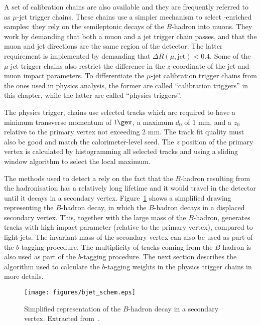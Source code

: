 A set of calibration chains are also available and they are frequently referred to as $\mu$-jet trigger chains. These chains use a simpler mechanism to select \bjet-enriched
samples: they rely on the semileptonic decays of the $B$-hadron into muons. They work by demanding that both a muon and a jet trigger chain passes, and that the muon and
jet directions are the same region of the detector. The latter requirement is implemented by demanding that $\Delta R(\mu, \textrm{jet}) < 0.4$. Some of the $\mu$-jet
trigger chains also restrict the difference in the $z$-coordinate of the jet and muon impact parameters.
To differentiate the $\mu$-jet calibration trigger chains from the ones used in physics analysis, the former are called ``calibration triggers'' in this chapter, while
the latter are called ``physics triggers''.

The \bjet physics trigger, chains use selected tracks which are required to have a minimum transverse momentum of $1\gev$,
a maximum $d_0$ of $1$ mm, and a $z_0$ relative to the primary vertex not exceeding $2$ mm.
The track fit quality must also be good and match the calorimeter-level seed.
The $z$ position of the primary vertex is calculated by histogramming all selected tracks and using a sliding window
algorithm to select the local maximum.

The methods used to detect a \bjet rely on the fact that the $B$-hadron resulting from the \bjet hadronisation has a relatively long lifetime and it would
travel in the detector until it decays in a secondary vertex. Figure~\ref{fig:bjet_schem} shows a simplified
drawing representing the $B$-hadron decay, in which the $B$-hadron decays in a displaced secondary vertex. This, together with the large mass of the $B$-hadron,
generates tracks with high impact parameter (relative to the primary vertex), compared to light-jets.
The invariant mass
of the secondary vertex can also be used as part of the $b$-tagging procedure. The multiplicity of tracks coming from the $B$-hadron is also
used as part of the $b$-tagging procedure.
The next section describes the algorithm used to calculate the $b$-tagging weights in the \bjet physics trigger chains in more details.

\begin{figure}[tpbp]
\centering
\texttt{[image: figures/bjet\_schem.eps]}
\caption{Simplified representation of the $B$-hadron decay in a secondary vertex. Extracted from~\cite{bjet_proc_pelle}.}
\label{fig:bjet_schem}
\end{figure}


